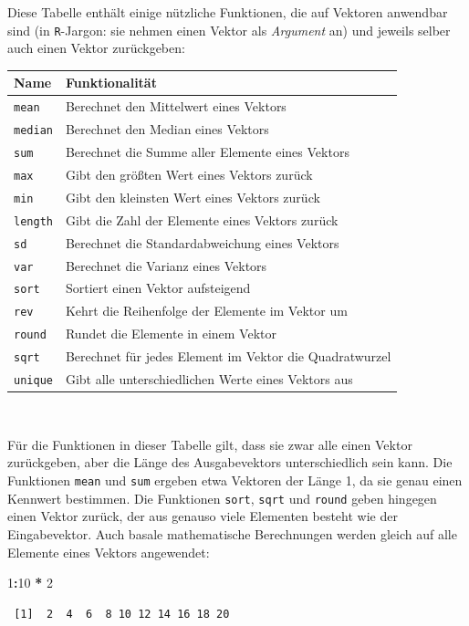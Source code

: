 \documentclass[12pt,]{tufte-book}
\newenvironment{Shaded}{\begin{snugshade}}{\end{snugshade}}
\newcommand{\DecValTok}[1]{\textcolor[rgb]{0.00,0.00,0.81}{#1}}
\newcommand{\StringTok}[1]{\textcolor[rgb]{0.31,0.60,0.02}{#1}}
\newcommand{\OperatorTok}[1]{\textcolor[rgb]{0.81,0.36,0.00}{\textbf{#1}}}
\theoremstyle{definition}
\theoremstyle{definition}
\theoremstyle{definition}
\theoremstyle{remark}
\begin{document}
Diese Tabelle enthält einige nützliche Funktionen, die auf Vektoren
anwendbar sind (in \texttt{R}-Jargon: sie nehmen einen Vektor als
\emph{Argument} an) und jeweils selber auch einen Vektor zurückgeben:

\begin{longtable}[]{@{}ll@{}}
\toprule
Name & Funktionalität\tabularnewline
\midrule
\endhead
\texttt{mean} & Berechnet den Mittelwert eines Vektors\tabularnewline
\texttt{median} & Berechnet den Median eines Vektors\tabularnewline
\texttt{sum} & Berechnet die Summe aller Elemente eines
Vektors\tabularnewline
\texttt{max} & Gibt den größten Wert eines Vektors zurück\tabularnewline
\texttt{min} & Gibt den kleinsten Wert eines Vektors
zurück\tabularnewline
\texttt{length} & Gibt die Zahl der Elemente eines Vektors
zurück\tabularnewline
\texttt{sd} & Berechnet die Standardabweichung eines
Vektors\tabularnewline
\texttt{var} & Berechnet die Varianz eines Vektors\tabularnewline
\texttt{sort} & Sortiert einen Vektor aufsteigend\tabularnewline
\texttt{rev} & Kehrt die Reihenfolge der Elemente im Vektor
um\tabularnewline
\texttt{round} & Rundet die Elemente in einem Vektor\tabularnewline
\texttt{sqrt} & Berechnet für jedes Element im Vektor die
Quadratwurzel\tabularnewline
\texttt{unique} & Gibt alle unterschiedlichen Werte eines Vektors
aus\tabularnewline
\bottomrule
\end{longtable}

~

Für die Funktionen in dieser Tabelle gilt, dass sie zwar alle einen
Vektor zurückgeben, aber die Länge des Ausgabevektors unterschiedlich
sein kann. Die Funktionen \texttt{mean} und \texttt{sum} ergeben etwa
Vektoren der Länge 1, da sie genau einen Kennwert bestimmen. Die
Funktionen \texttt{sort}, \texttt{sqrt} und \texttt{round} geben
hingegen einen Vektor zurück, der aus genauso viele Elementen besteht
wie der Eingabevektor. Auch basale mathematische Berechnungen werden
gleich auf alle Elemente eines Vektors angewendet:

\begin{Shaded}
\begin{Highlighting}[]
\DecValTok{1}\OperatorTok{:}\DecValTok{10} \OperatorTok{*}\StringTok{ }\DecValTok{2}
\end{Highlighting}
\end{Shaded}

\begin{verbatim}
 [1]  2  4  6  8 10 12 14 16 18 20
\end{verbatim}
\end{document}
